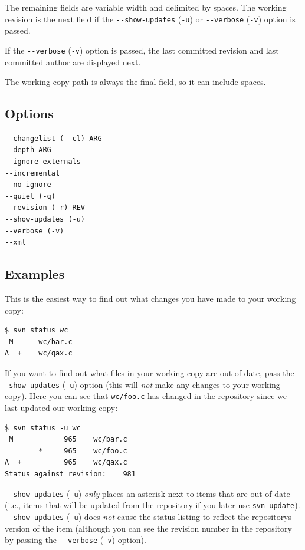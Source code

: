 The remaining fields are variable width and delimited by spaces. The
working revision is the next field if the \texttt{-\/-show-updates}
(\texttt{-u}) or \texttt{-\/-verbose} (\texttt{-v}) option is passed.

If the \texttt{-\/-verbose} (\texttt{-v}) option is passed, the last
committed revision and last committed author are displayed next.

The working copy path is always the final field, so it can include
spaces.

\subsection{Options}

\begin{verbatim}
--changelist (--cl) ARG
--depth ARG
--ignore-externals
--incremental
--no-ignore
--quiet (-q)
--revision (-r) REV
--show-updates (-u)
--verbose (-v)
--xml
\end{verbatim}

\subsection{Examples}

This is the easiest way to find out what changes you have made to your
working copy:

\begin{verbatim}
$ svn status wc
 M      wc/bar.c
A  +    wc/qax.c
\end{verbatim}

If you want to find out what files in your working copy are out of date,
pass the \texttt{-\/-show-updates} (\texttt{-u}) option (this will
\emph{not} make any changes to your working copy). Here you can see that
\texttt{wc/foo.c} has changed in the repository since we last updated
our working copy:

\begin{verbatim}
$ svn status -u wc
 M            965    wc/bar.c
        *     965    wc/foo.c
A  +          965    wc/qax.c
Status against revision:    981
\end{verbatim}

\texttt{-\/-show-updates} (\texttt{-u}) \emph{only} places an asterisk
next to items that are out of date (i.e., items that will be updated
from the repository if you later use \texttt{svn\ update}).
\texttt{-\/-show-updates} (\texttt{-u}) does \emph{not} cause the status
listing to reflect the repository\textquotesingle s version of the item
(although you can see the revision number in the repository by passing
the \texttt{-\/-verbose} (\texttt{-v}) option).

